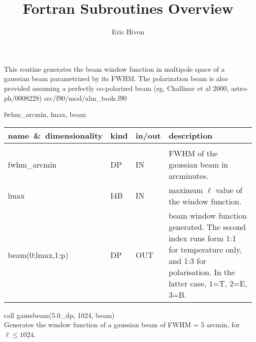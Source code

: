 
\sloppy


\title{\healpix Fortran Subroutines Overview}
 \section[gaussbeam]{ }
\label{sub:gaussbeam}
\author{Eric Hivon}

\begin{facility}
{This routine generates the beam window function in multipole space of a
  gaussian beam parametrized by its FWHM. The
polarization beam is also provided assuming a perfectly
co-polarized beam (eg, Challinor et al 2000, astro-ph/0008228)}
{src/f90/mod/alm\_tools.f90}
\end{facility}

\begin{f90format}
{fwhm\_arcmin, lmax, beam}
\end{f90format}

\begin{arguments}
{
\begin{tabular}{p{0.35\hsize} p{0.05\hsize} p{0.05\hsize} p{0.45\hsize}} \hline  
\textbf{name~\&~dimensionality} & \textbf{kind} & \textbf{in/out} & \textbf{description} \\ \hline
                   &   &   &                           \\ %
fwhm\_arcmin & DP & IN & FWHM of the gaussian beam in arcminutes. \\
lmax & I4B & IN & maximum $\ell$ value of the window function.   \\
beam(0:lmax,1:p) & DP & OUT & beam window function generated. The second index runs form 1:1 for temperature only, and 1:3 for polarisation. In the latter case, 1=T, 2=E, 3=B.\\
\end{tabular}
}
\end{arguments}

\begin{example}
{
call gaussbeam(5.0\_dp, 1024, beam)  \\
}
{
Generates the window function of a gaussian beam of FWHM = 5 arcmin, for $\ell
\leq 1024$.
}
\end{example}


